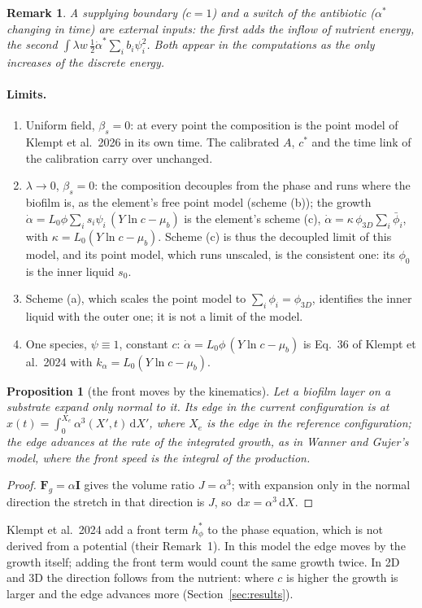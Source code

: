 \documentclass[11pt,a4paper]{article}
\newtheorem{proposition}{Proposition}
\newtheorem{remark}{Remark}
\newcommand{\dd}{\,\mathrm{d}}
\newcommand{\living}{\textstyle\sum_i s_i\psi_i}
\begin{document}
\begin{remark}
A supplying boundary ($c=1$) and a switch of the antibiotic ($\alpha^*$ changing in time) are
external inputs: the first adds the inflow of nutrient energy, the second
$\int\lambda w\,\tfrac12\dot\alpha^*\sum_ib_i\psi_i^2$. Both appear in the computations as the
only increases of the discrete energy.
\end{remark}

\paragraph{Limits.}
\begin{enumerate}
\item Uniform field, $\beta_s=0$: at every point the composition is the point model of Klempt
  et al.\ 2026 in its own time. The calibrated $A$, $c^*$ and the time link of the calibration
  carry over unchanged.
\item $\lambda\to0$, $\beta_s=0$: the composition decouples from the phase and runs where the
  biofilm is, as the element's free point model (scheme (b)); the growth
  $\dot\alpha=L_0\phi\living\,(Y\ln c-\mu_b)$ is the element's scheme (c),
  $\dot\alpha=\kappa\,\phi_{3D}\sum_i\bar\phi_i$, with $\kappa=L_0(Y\ln c-\mu_b)$. Scheme (c)
  is thus the decoupled limit of this model, and its point model, which runs unscaled, is the
  consistent one: its $\phi_0$ is the inner liquid $s_0$.
\item Scheme (a), which scales the point model to $\sum_i\phi_i=\phi_{3D}$, identifies the
  inner liquid with the outer one; it is not a limit of the model.
\item One species, $\psi\equiv1$, constant $c$: $\dot\alpha=L_0\phi\,(Y\ln c-\mu_b)$ is Eq.~36
  of Klempt et al.\ 2024 with $k_\alpha=L_0(Y\ln c-\mu_b)$.
\end{enumerate}

\begin{proposition}[the front moves by the kinematics]\label{prop:front}
Let a biofilm layer on a substrate expand only normal to it. Its edge in the current
configuration is at $x(t)=\int_0^{X_e}\alpha^3(X',t)\dd X'$, where $X_e$ is the edge in the
reference configuration; the edge advances at the rate of the integrated growth, as in
Wanner and Gujer's model, where the front speed is the integral of the production.
\end{proposition}
\begin{proof}
$\mathbf F_g=\alpha\mathbf I$ gives the volume ratio $J=\alpha^3$; with expansion only in the
normal direction the stretch in that direction is $J$, so $\dd x=\alpha^3\dd X$.
\end{proof}
Klempt et al.\ 2024 add a front term $h^*_\phi$ to the phase equation, which is not derived
from a potential (their Remark~1). In this model the edge moves by the growth itself; adding the
front term would count the same growth twice. In 2D and 3D the direction follows from the
nutrient: where $c$ is higher the growth is larger and the edge advances more (Section~\ref{sec:results}).
\end{document}
